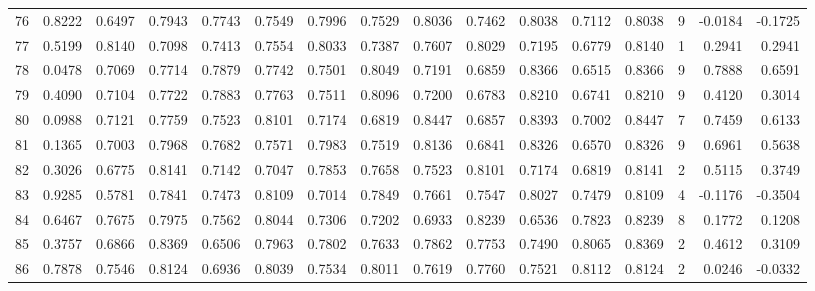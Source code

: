 \begin{tabular}{lrrrrrrrrrrrrrrr}
76  &      0.8222 &  0.6497 &  0.7943 &  0.7743 &  0.7549 &  0.7996 &  0.7529 &  0.8036 &  0.7462 &  0.8038 &   0.7112 &     0.8038 &      9 &                   -0.0184 &                    -0.1725 \\
77  &      0.5199 &  0.8140 &  0.7098 &  0.7413 &  0.7554 &  0.8033 &  0.7387 &  0.7607 &  0.8029 &  0.7195 &   0.6779 &     0.8140 &      1 &                    0.2941 &                     0.2941 \\
78  &      0.0478 &  0.7069 &  0.7714 &  0.7879 &  0.7742 &  0.7501 &  0.8049 &  0.7191 &  0.6859 &  0.8366 &   0.6515 &     0.8366 &      9 &                    0.7888 &                     0.6591 \\
79  &      0.4090 &  0.7104 &  0.7722 &  0.7883 &  0.7763 &  0.7511 &  0.8096 &  0.7200 &  0.6783 &  0.8210 &   0.6741 &     0.8210 &      9 &                    0.4120 &                     0.3014 \\
80  &      0.0988 &  0.7121 &  0.7759 &  0.7523 &  0.8101 &  0.7174 &  0.6819 &  0.8447 &  0.6857 &  0.8393 &   0.7002 &     0.8447 &      7 &                    0.7459 &                     0.6133 \\
81  &      0.1365 &  0.7003 &  0.7968 &  0.7682 &  0.7571 &  0.7983 &  0.7519 &  0.8136 &  0.6841 &  0.8326 &   0.6570 &     0.8326 &      9 &                    0.6961 &                     0.5638 \\
82  &      0.3026 &  0.6775 &  0.8141 &  0.7142 &  0.7047 &  0.7853 &  0.7658 &  0.7523 &  0.8101 &  0.7174 &   0.6819 &     0.8141 &      2 &                    0.5115 &                     0.3749 \\
83  &      0.9285 &  0.5781 &  0.7841 &  0.7473 &  0.8109 &  0.7014 &  0.7849 &  0.7661 &  0.7547 &  0.8027 &   0.7479 &     0.8109 &      4 &                   -0.1176 &                    -0.3504 \\
84  &      0.6467 &  0.7675 &  0.7975 &  0.7562 &  0.8044 &  0.7306 &  0.7202 &  0.6933 &  0.8239 &  0.6536 &   0.7823 &     0.8239 &      8 &                    0.1772 &                     0.1208 \\
85  &      0.3757 &  0.6866 &  0.8369 &  0.6506 &  0.7963 &  0.7802 &  0.7633 &  0.7862 &  0.7753 &  0.7490 &   0.8065 &     0.8369 &      2 &                    0.4612 &                     0.3109 \\
86  &      0.7878 &  0.7546 &  0.8124 &  0.6936 &  0.8039 &  0.7534 &  0.8011 &  0.7619 &  0.7760 &  0.7521 &   0.8112 &     0.8124 &      2 &                    0.0246 &                    -0.0332 \\

\end{tabular}
